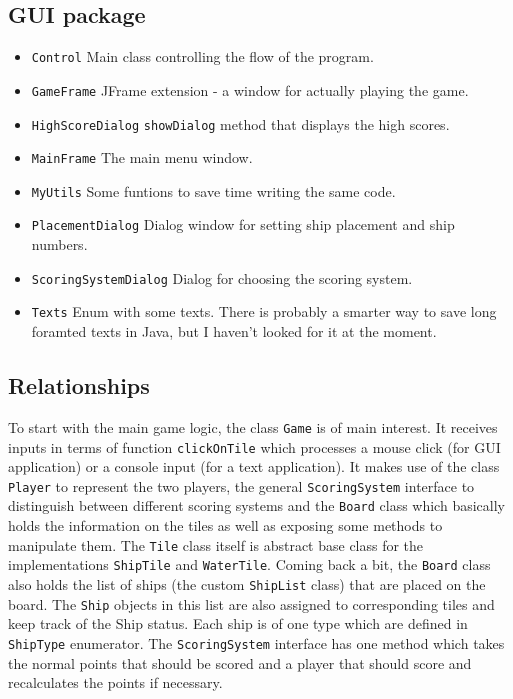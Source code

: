 \documentclass[]{article}
\begin{document}
\subsection{GUI package}

\begin{itemize}
	\itemsep0em 
	\item \texttt{Control} Main class controlling the flow of the program.
	\item \texttt{GameFrame} JFrame extension - a window for actually playing the game.
	\item \texttt{HighScoreDialog} \texttt{showDialog} method that displays the high scores.
	\item \texttt{MainFrame} The main menu window.
	\item \texttt{MyUtils} Some funtions to save time writing the same code.
	\item \texttt{PlacementDialog} Dialog window for setting ship placement and ship numbers.
	\item \texttt{ScoringSystemDialog} Dialog for choosing the scoring system.
	\item \texttt{Texts} Enum with some texts. There is probably a smarter way to save long foramted texts in Java, but I haven't looked for it at the moment.
\end{itemize}

\subsection{Relationships}
To start with the main game logic, the class \texttt{Game} is of main interest. It receives inputs in terms of function \texttt{clickOnTile} which processes a mouse click (for GUI application) or a console input (for a text application). It makes use of the class \texttt{Player} to represent the two players, the general \texttt{ScoringSystem} interface to distinguish between different scoring systems and the \texttt{Board} class which basically holds the information on the tiles as well as exposing some methods to manipulate them. The \texttt{Tile} class itself is abstract base class for the implementations \texttt{ShipTile} and \texttt{WaterTile}. Coming back a bit, the \texttt{Board} class also holds the list of ships (the custom \texttt{ShipList} class) that are placed on the board. The \texttt{Ship} objects in this list are also assigned to corresponding tiles and keep track of the Ship status. Each ship is of one type which are defined in \texttt{ShipType} enumerator. The \texttt{ScoringSystem} interface has one method which takes the normal points that should be scored and a player that should score and recalculates the points if necessary.
\end{document}
